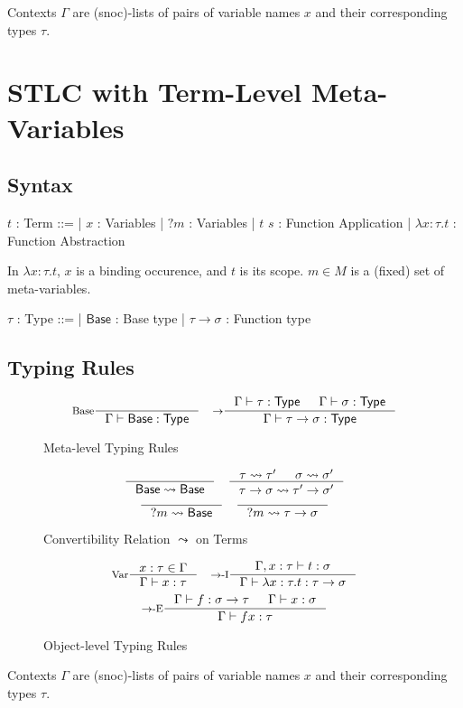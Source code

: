 \documentclass[a4paper]{report}
\newcommand{\Base}[0]{\mathsf{Base}}
\newcommand{\Type}[0]{\mathsf{Type}}
\newcommand{\Intro}[1]{#1-\textrm{I}}
\newcommand{\Elim}[1]{#1-\textrm{E}}
\newcommand{\Conv}[2]{#1 \leadsto #2}
\begin{document}
Contexts $\Gamma$ are (snoc)-lists of pairs of variable names $x$ and their corresponding types $\tau$.


\newpage
\section{STLC with Term-Level Meta-Variables}
\subsection{Syntax}
\begin{bnf}
$t$ : \textsf{Term} ::=
| $x$ : Variables
| $?m$ : Variables
| $t$ $s$ : Function Application
| $\lambda x \colon \tau. t$ : Function Abstraction
\end{bnf}

\hfill\break
In $\lambda x \colon \tau. t$, $x$ is a binding occurence, and $t$ is its scope.
$m \in M$ is a (fixed) set of meta-variables.

\noindent
\begin{bnf}
$\tau$ : \textsf{Type} ::=
| $\Base$ : Base type
| $\tau \to \sigma$ : Function type
\end{bnf}

\subsection{Typing Rules}
\begin{figure*}[h]
   \[
    \inference[Base]{}
                    {\Gamma \vdash \Base : \Type}
    \quad
    \inference[$\to$]{\Gamma \vdash \tau : \Type & \Gamma \vdash \sigma : \Type}
                     {\Gamma \vdash \tau \to \sigma : \Type}
  \]
  
  \caption*{Meta-level Typing Rules}
  \label{fig:base-stlc-mltr}
\end{figure*}

\begin{figure*}[h]
   \[
    \inference[]{}
                {\Conv{\Base}{\Base}}
    \quad
    \inference[]{\Conv{\tau}{\tau'} & \Conv{\sigma}{\sigma'}}
                {\Conv{\tau \to \sigma}{\tau' \to \sigma'}}
  \]
   \[
    \inference[]{}
                {\Conv{?m}{\Base}}
    \quad
    \inference[]{}
                {\Conv{?m}{\tau \to \sigma}}
  \]
  
  \caption*{Convertibility Relation $\Conv{}{}$ on Terms}
  \label{fig:base-stlc-mltr}
\end{figure*}

\begin{figure*}[h]
  \[
    \inference[Var]{x : \tau \in \Gamma}
                   {\Gamma \vdash x : \tau}
    \quad
    \inference[\Intro{$\to$}]{\Gamma, x : \tau \vdash t : \sigma}
                             {\Gamma \vdash \lambda x : \tau. t : \tau \to \sigma}
  \]
  \[
    \inference[\Elim{$\to$}]{\Gamma \vdash f : \sigma \to \tau & \Gamma \vdash x : \sigma}
                            {\Gamma \vdash f x : \tau}
  \]
  
  \caption*{Object-level Typing Rules}
  \label{fig:base-stlc-oltr}
\end{figure*}

Contexts $\Gamma$ are (snoc)-lists of pairs of variable names $x$ and their corresponding types $\tau$.
\end{document}
